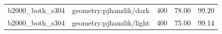 \begin{longtable}{l>{\raggedright\arraybackslash}p{.42\linewidth}rrr}
b2000\_\allowbreak{}both\_\allowbreak{}s304 & %
geometry:pjhanzlik/dark & %
400 & %
78.00 & %
99.20 \\ %

b2000\_\allowbreak{}both\_\allowbreak{}s304 & %
geometry:pjhanzlik/light & %
400 & %
75.00 & %
99.14 \\ %


\end{longtable}
